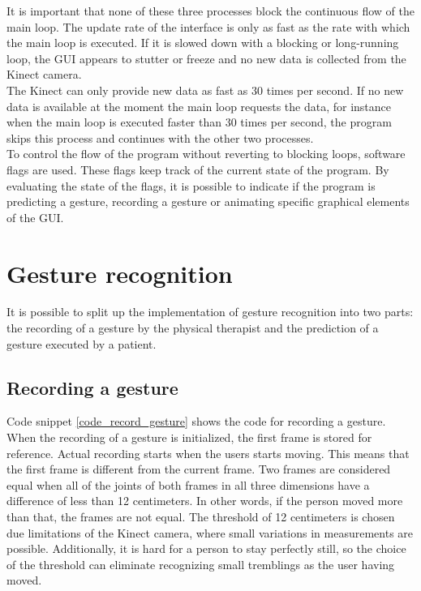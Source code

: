 It is important that none of these three processes block the continuous flow of the main loop. The update rate of the interface is only as fast as the rate with which the main loop is executed. If it is slowed down with a blocking or long-running loop, the GUI appears to stutter or freeze and no new data is collected from the Kinect camera.\\

The Kinect can only provide new data as fast as 30 times per second. If no new data is available at the moment the main loop requests the data, for instance when the main loop is executed faster than 30 times per second, the program skips this process and continues with the other two processes.\\

To control the flow of the program without reverting to blocking loops, software flags are used. These flags keep track of the current state of the program. By evaluating the state of the flags, it is possible to indicate if the program is predicting a gesture, recording a gesture or animating specific graphical elements of the GUI.


\section{Gesture recognition}

It is possible to split up the implementation of gesture recognition into two parts: the recording of a gesture by the physical therapist and the prediction of a gesture executed by a patient.


\subsection{Recording a gesture}

Code snippet \ref{code_record_gesture} shows the code for recording a gesture. When the recording of a gesture is initialized, the first frame is stored for reference. Actual recording starts when the users starts moving. This means that the first frame is different from the current frame. Two frames are considered equal when all of the joints of both frames in all three dimensions have a difference of less than 12 centimeters. In other words, if the person moved more than that, the frames are not equal. The threshold of 12 centimeters is chosen due limitations of the Kinect camera, where small variations in measurements are possible. Additionally, it is hard for a person to stay perfectly still, so the choice of the threshold can eliminate recognizing small tremblings as the user having moved.\\

